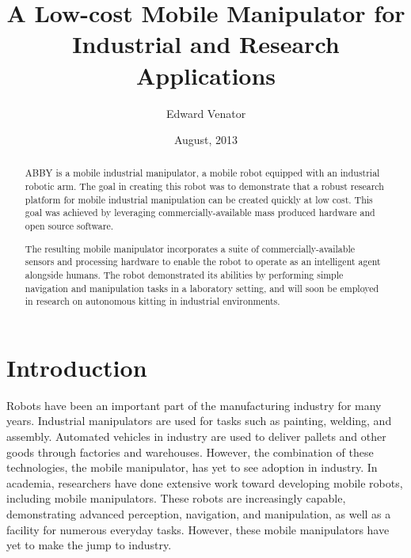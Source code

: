 \documentclass[]{cwru} %
\title{A Low-cost Mobile Manipulator for Industrial and Research Applications}
\author{Edward Venator}
\date{August, 2013} %
\begin{document}



% 

\maketitle
\makeapprovalsheet

\frontmatter
\tableofcontents

\cleardoublepage
{}
{}
\listoftables

\cleardoublepage
{}
{}
\listoffigures

\begin{abstract}
ABBY is a mobile industrial manipulator, a mobile robot equipped with an
industrial robotic arm. The goal in creating this robot was to
demonstrate that a robust research platform for mobile industrial
manipulation can be created quickly at low cost. This goal was achieved
by leveraging commercially-available mass produced hardware and open
source software.

The resulting mobile manipulator incorporates a suite of
commercially-available sensors and processing hardware to enable the
robot to operate as an intelligent agent alongside humans. The robot
demonstrated its abilities by performing simple navigation and
manipulation tasks in a laboratory setting, and will soon be employed in
research on autonomous kitting in industrial environments.
\end{abstract}

\mainmatter
\chapter{Introduction}

Robots have been an important part of the manufacturing industry for
many years. Industrial manipulators are used for tasks such as painting,
welding, and assembly. Automated vehicles in industry are used to
deliver pallets and other goods through factories and warehouses.
However, the combination of these technologies, the mobile manipulator,
has yet to see adoption in industry. In academia, researchers have done
extensive work toward developing mobile robots, including mobile
manipulators. These robots are increasingly capable, demonstrating
advanced perception, navigation, and manipulation, as well as a facility
for numerous everyday tasks. However, these mobile manipulators have yet
to make the jump to industry.
\end{document}
